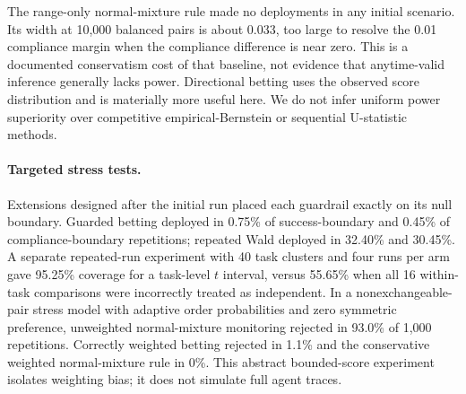 The range-only normal-mixture rule made no deployments in any initial
scenario. Its width at 10,000 balanced pairs is about 0.033, too large to
resolve the 0.01 compliance margin when the compliance difference is
near zero. This is a documented conservatism cost of that baseline, not
evidence that anytime-valid inference generally lacks power. Directional
betting uses the observed score distribution and is materially more
useful here. We do not infer uniform power superiority over competitive
empirical-Bernstein or sequential U-statistic methods.

\paragraph{Targeted stress tests.}
Extensions designed after the initial run placed each guardrail exactly
on its null boundary. Guarded betting deployed in 0.75\% of
success-boundary and 0.45\% of compliance-boundary repetitions; repeated
Wald deployed in 32.40\% and 30.45\%. A separate repeated-run experiment
with 40 task clusters and four runs per arm gave 95.25\% coverage for a
task-level $t$ interval, versus 55.65\% when all 16 within-task comparisons
were incorrectly treated as independent. In a nonexchangeable-pair
stress model with adaptive order probabilities and zero symmetric
preference, unweighted normal-mixture monitoring rejected in 93.0\%
of 1,000 repetitions. Correctly weighted betting rejected in 1.1\%
and the conservative weighted normal-mixture rule in 0\%. This abstract
bounded-score experiment isolates weighting bias; it does not simulate
full agent traces.


